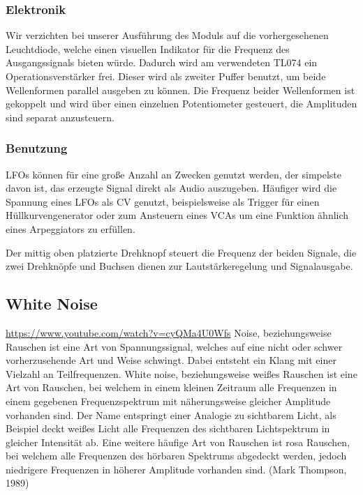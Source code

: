 \subsubsection{Elektronik}
\label{sec:orge253ed4}
Wir verzichten bei unserer Ausführung des Moduls auf die vorhergesehenen Leuchtdiode, welche einen visuellen Indikator für die Frequenz des Ausgangssignals bieten würde. Dadurch wird am verwendeten TL074 ein Operationsverstärker frei. Dieser wird als zweiter Puffer benutzt, um beide Wellenformen parallel ausgeben zu können. Die Frequenz beider Wellenformen ist gekoppelt und wird über einen einzelnen Potentiometer gesteuert, die Amplituden sind separat anzusteuern.

\subsubsection{Benutzung}
\label{sec:org956d4db}
\acp{LFO} können für eine große Anzahl an Zwecken genutzt werden, der simpelste davon ist, das erzeugte Signal direkt als Audio auszugeben. Häufiger wird die Spannung eines LFOs als \acl{CV} genutzt, beispielsweise als Trigger für einen Hüllkurvengenerator oder zum Ansteuern eines \acp{VCA} um eine Funktion ähnlich eines Arpeggiators zu erfüllen.

Der mittig oben platzierte Drehknopf steuert die Frequenz der beiden Signale, die zwei Drehknöpfe und Buchsen dienen zur Lautstärkeregelung und Signalausgabe.

\subsection{White Noise}
\label{sec:orgacf2127}
\url{https://www.youtube.com/watch?v=cyQMa4U0Wfs}
Noise, beziehungsweise Rauschen ist eine Art von Spannungssignal, welches auf eine nicht oder schwer vorherzusehende Art und Weise schwingt. Dabei entsteht ein Klang mit einer Vielzahl an Teilfrequenzen. White noise, beziehungsweise weißes Rauschen ist eine Art von Rauschen, bei welchem in einem kleinen Zeitraum alle Frequenzen in einem gegebenen Frequenzspektrum mit näherungsweise gleicher Amplitude vorhanden sind. Der Name entspringt einer Analogie zu sichtbarem Licht, als Beispiel deckt weißes Licht alle Frequenzen des sichtbaren Lichtspektrum in gleicher Intensität ab. Eine weitere häufige Art von Rauschen ist rosa Rauschen, bei welchem alle Frequenzen des hörbaren Spektrums abgedeckt werden, jedoch niedrigere Frequenzen in höherer Amplitude vorhanden sind.
(Mark Thompson, 1989)

